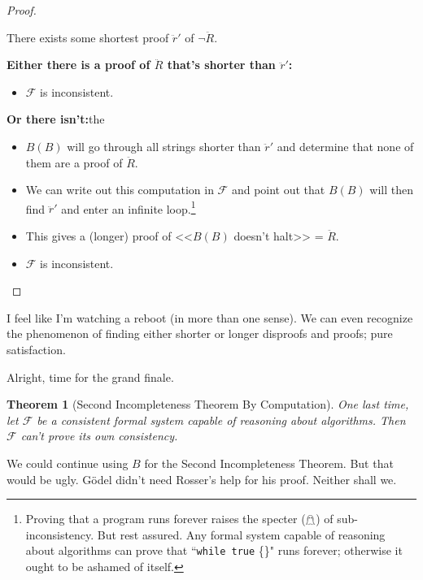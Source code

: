 \documentclass{article}
\theoremstyle{theorem}
\newtheorem{theorem}{Theorem}
\newcommand{\nameditem}[1]{\item\textbf{#1}}
\newcommand{\impl}{\item[$\Rightarrow$]}
\begin{document}
\begin{proof}
\begin{description}
\begin{description}
\impl There exists some shortest proof $\ddot{r}'$ of $\neg \ddot{R}$.
\nameditem{Either there is a proof of $\ddot{R}$ that's shorter than $\ddot{r}'$:}
\begin{itemize}
\impl $\mathcal{F}$ is inconsistent. \lightning
\end{itemize}
\nameditem{Or there isn't:}the
\begin{itemize}
\impl $B(B)$ will go through all strings shorter than $\ddot{r}'$ and determine that none of them are a proof of $\ddot{R}$.
\impl We can write out this computation in $\mathcal{F}$ and point out that $B(B)$ will then find $\ddot{r}'$ and enter an infinite loop.\footnote{Proving that a program runs forever raises the specter ($\mathghost$) of sub-inconsistency. But rest assured. Any formal system capable of reasoning about algorithms can prove that ``\lstinline{while true} \{\}" runs forever; otherwise it ought to be ashamed of itself.}
\impl This gives a (longer) proof of <<$B(B)$ doesn't halt>> = $\ddot{R}$.
\impl $\mathcal{F}$ is inconsistent. \lightning
\end{itemize}
\end{description}
\end{description}
\end{proof}

I feel like I'm watching a reboot (in more than one sense). We can even recognize the phenomenon of finding either shorter or longer disproofs and proofs; pure satisfaction.

Alright, time for the grand finale.

\begin{theorem}[Second Incompleteness Theorem By Computation]
One last time, let $\mathcal{F}$ be a consistent formal system capable of reasoning about algorithms. Then $\mathcal{F}$ can't prove its own consistency.
\end{theorem}

We could continue using $B$ for the Second Incompleteness Theorem. But that would be ugly. Gödel didn't need Rosser's help for his proof. Neither shall we.
\end{document}

